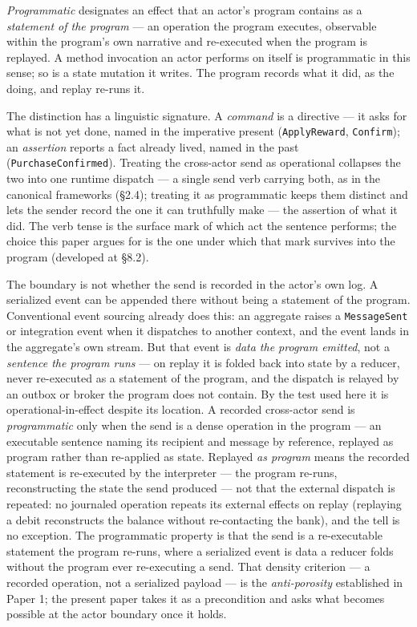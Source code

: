 \documentclass[
]{article}
\let\origtexttt\texttt%
\renewcommand{\texttt}[1]{\origtexttt{\seqsplit{#1}}}%
\let\texttt\origtexttt%
\begin{document}
\emph{Programmatic} designates an effect that an actor's program
contains as a \emph{statement of the program} --- an operation the
program executes, observable within the program's own narrative and
re-executed when the program is replayed. A method invocation an actor
performs on itself is programmatic in this sense; so is a state mutation
it writes. The program records what it did, as the doing, and replay
re-runs it.

The distinction has a linguistic signature. A \emph{command} is a
directive --- it asks for what is not yet done, named in the imperative
present (\texttt{ApplyReward}, \texttt{Confirm}); an \emph{assertion}
reports a fact already lived, named in the past
(\texttt{PurchaseConfirmed}). Treating the cross-actor send as
operational collapses the two into one runtime dispatch --- a single
send verb carrying both, as in the canonical frameworks (§2.4); treating
it as programmatic keeps them distinct and lets the sender record the
one it can truthfully make --- the assertion of what it did. The verb
tense is the surface mark of which act the sentence performs; the choice
this paper argues for is the one under which that mark survives into the
program (developed at §8.2).

The boundary is not whether the send is recorded in the actor's own log.
A serialized event can be appended there without being a statement of
the program. Conventional event sourcing already does this: an aggregate
raises a \texttt{MessageSent} or integration event when it dispatches to
another context, and the event lands in the aggregate's own stream. But
that event is \emph{data the program emitted}, not a \emph{sentence the
program runs} --- on replay it is folded back into state by a reducer,
never re-executed as a statement of the program, and the dispatch is
relayed by an outbox or broker the program does not contain. By the test
used here it is operational-in-effect despite its location. A recorded
cross-actor send is \emph{programmatic} only when the send is a dense
operation in the program --- an executable sentence naming its recipient
and message by reference, replayed as program rather than re-applied as
state. Replayed \emph{as program} means the recorded statement is
re-executed by the interpreter --- the program re-runs, reconstructing
the state the send produced --- not that the external dispatch is
repeated: no journaled operation repeats its external effects on replay
(replaying a debit reconstructs the balance without re-contacting the
bank), and the tell is no exception. The programmatic property is that
the send is a re-executable statement the program re-runs, where a
serialized event is data a reducer folds without the program ever
re-executing a send. That density criterion --- a recorded operation,
not a serialized payload --- is the \emph{anti-porosity} established in
Paper 1; the present paper takes it as a precondition and asks what
becomes possible at the actor boundary once it holds.
\end{document}
